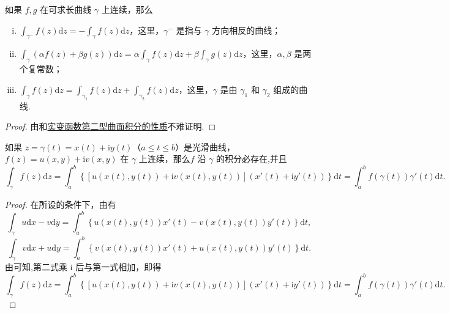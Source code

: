 \documentclass[../../main.tex]{subfiles}%
\begin{document}
\begin{theorem}\label{theorem:复积分的基本性质}
如果 \( f, g \) 在可求长曲线 \( \gamma \) 上连续，那么
\begin{enumerate}[(i)]
\item \( \int_{\gamma^-} f(z)\mathrm{d}z = -\int_\gamma f(z)\mathrm{d}z \)，这里，\( \gamma^- \) 是指与 \( \gamma \) 方向相反的曲线；

\item \( \int_\gamma (\alpha f(z) + \beta g(z))\mathrm{d}z = \alpha \int_\gamma f(z)\mathrm{d}z + \beta \int_\gamma g(z)\mathrm{d}z \)，这里，\( \alpha, \beta \) 是两个复常数；

\item \( \int_\gamma f(z)\mathrm{d}z = \int_{\gamma_1} f(z)\mathrm{d}z + \int_{\gamma_2} f(z)\mathrm{d}z \)，这里，\( \gamma \) 是由 \( \gamma_1 \) 和 \( \gamma_2 \) 组成的曲线.
\end{enumerate}
\end{theorem}
\begin{proof}

由和\hyperref[Basis Analytics-theorem:第二型曲线积分的基本性质]{实变函数第二型曲面积分的性质}不难证明.

\end{proof}

\begin{theorem}\label{theorem:复变函数积分参数方程形式}
如果 \( z = \gamma(t) =x(t) + \mathrm{i}y(t)\)（\( a \leqslant t \leqslant b \)）是光滑曲线，\(  f(z)= u(x,y) + \mathrm{i}v(x,y) \) 在 \( \gamma \) 上连续，那么\( f \) 沿 \( \gamma \) 的积分必存在,并且
\[
\int_\gamma f(z)\mathrm{d}z
= \int_a^b \left\{ [u(x(t), y(t)) + \mathrm{i}v(x(t), y(t))](x'(t) + \mathrm{i}y'(t)) \right\} \mathrm{d}t
= \int_a^b f(\gamma(t))\gamma'(t)\mathrm{d}t.
\]
\end{theorem}
\begin{proof}

在所设的条件下，由有
\[
\int_\gamma u \mathrm{d}x - v \mathrm{d}y
= \int_a^b \left\{ u(x(t), y(t))x'(t) - v(x(t), y(t))y'(t) \right\} \mathrm{d}t,
\]
\[
\int_\gamma v \mathrm{d}x + u \mathrm{d}y
= \int_a^b \left\{ v(x(t), y(t))x'(t) + u(x(t), y(t))y'(t) \right\} \mathrm{d}t.
\]
由可知,第二式乘 \( \mathrm{i} \) 后与第一式相加，即得
\[
\int_\gamma f(z)\mathrm{d}z
= \int_a^b \left\{ [u(x(t), y(t)) + \mathrm{i}v(x(t), y(t))](x'(t) + \mathrm{i}y'(t)) \right\} \mathrm{d}t
= \int_a^b f(\gamma(t))\gamma'(t)\mathrm{d}t.
\]

\end{proof}
\end{document}
